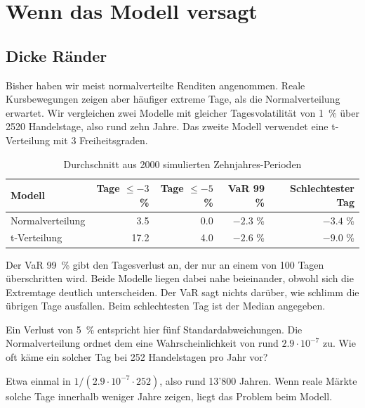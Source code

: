 \chapter{Wenn das Modell versagt}\label{chap:modell}



\section{Dicke Ränder}
Bisher haben wir meist normalverteilte Renditen angenommen. Reale Kursbewegungen zeigen aber häufiger extreme Tage, als die Normalverteilung erwartet. Wir vergleichen zwei Modelle mit gleicher Tagesvolatilität von 1~\% über 2520 Handelstage, also rund zehn Jahre. Das zweite Modell verwendet eine t-Verteilung mit 3 Freiheitsgraden.

\begin{table}[H]
	\centering
	\small
	\caption{Durchschnitt aus 2000 simulierten Zehnjahres-Perioden}
	\label{tab:extrem}
	\begin{tabular}{@{}lrrrr@{}}
		\midrule
		\textbf{Modell} & \textbf{Tage $\leq -3$ \%} & \textbf{Tage $\leq -5$ \%} & \textbf{\acrshort{VaR} 99 \%} & \textbf{Schlechtester Tag} \\
		\midrule
		Normalverteilung & 3.5 & 0.0 & $-2.3$ \% & $-3.4$ \% \\
		t-Verteilung & 17.2 & 4.0 & $-2.6$ \% & $-9.0$ \% \\
		\midrule
	\end{tabular}
\end{table}

Der \gls{VaR} 99~\% gibt den Tagesverlust an, der nur an einem von 100 Tagen überschritten wird. Beide Modelle liegen dabei nahe beieinander, obwohl sich die Extremtage deutlich unterscheiden. Der \acrshort{VaR} sagt nichts darüber, wie schlimm die übrigen Tage ausfallen. Beim schlechtesten Tag ist der Median angegeben.

\begin{myexercise}
	Ein Verlust von 5~\% entspricht hier fünf Standardabweichungen. Die Normalverteilung ordnet dem eine Wahrscheinlichkeit von rund $2.9\cdot 10^{-7}$ zu. Wie oft käme ein solcher Tag bei 252 Handelstagen pro Jahr vor?
	\begin{myanswer}
		Etwa einmal in $1/(2.9\cdot 10^{-7}\cdot 252)$, also rund 13'800 Jahren. Wenn reale Märkte solche Tage innerhalb weniger Jahre zeigen, liegt das Problem beim Modell.
	\end{myanswer}
\end{myexercise}

